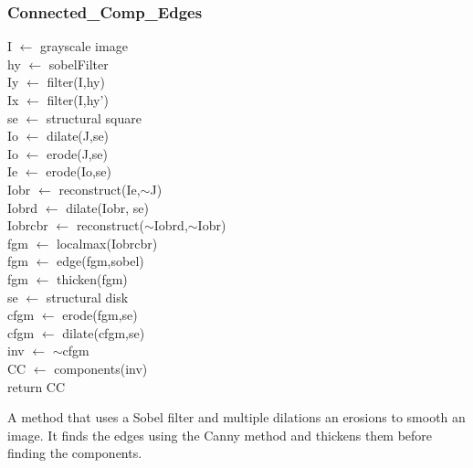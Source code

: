 \documentclass[12pt]{article}
\begin{document}
\subsubsection*{Connected\_Comp\_Edges}
\begin{addmargin}[12em]{1em}
	I $\leftarrow$ grayscale image \\
	hy $\leftarrow$ sobelFilter \\
	Iy $\leftarrow$ filter(I,hy) \\
	Ix $\leftarrow$ filter(I,hy') \\
	se $\leftarrow$ structural square \\
	Io $\leftarrow$ dilate(J,se) \\
	Io $\leftarrow$ erode(J,se) \\
	Ie $\leftarrow$ erode(Io,se) \\
	Iobr $\leftarrow$ reconstruct(Ie,$\sim$J) \\
	Iobrd $\leftarrow$ dilate(Iobr, se) \\
	Iobrcbr $\leftarrow$ reconstruct($\sim$Iobrd,$\sim$Iobr) \\
	fgm $\leftarrow$ localmax(Iobrcbr) \\
	fgm $\leftarrow$ edge(fgm,sobel) \\
	fgm $\leftarrow$ thicken(fgm) \\
	se $\leftarrow$ structural disk \\
	cfgm $\leftarrow$ erode(fgm,se) \\
	cfgm $\leftarrow$ dilate(cfgm,se) \\
	inv $\leftarrow$ $\sim$cfgm \\
	CC $\leftarrow$ components(inv) \\
	return CC \\		
\end{addmargin}
A method that uses a Sobel filter and multiple dilations an erosions to smooth an image. It finds the edges using the Canny method and thickens them before finding the components.
\end{document}
